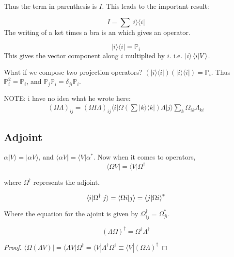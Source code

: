 \documentclass[11pt]{scrartcl}
\begin{document}
Thus the term in parenthesis is $ I $. This leads to the important result:

\begin{equation}
	I = \sum |i \rangle \langle i | 
\end{equation}
The writing of a ket times a bra is an  which gives an operator. 
\begin{definition}
\begin{equation}
	|i \rangle \langle i | = \mathds{P}_i
\end{equation}
This gives the vector component along $ i $ multiplied by $ i $. i.e. $ |i \rangle \braket{i|V}  $. 
\end{definition}

What if we compose two projection operators? $ (|i \rangle \langle i | ) ( |i \rangle \langle i | ) = \mathds{P}_i$. Thus $ \mathds{P}_i^2 = \mathds{P}_i $, and $ \mathds{P}_j \mathds{P}_i = \delta _{ji} \mathds{P}_i $.


NOTE: i have no idea what he wrote here:
\begin{align}
	(\Omega \Lambda) _{ij} = (\Omega I \Lambda) _{ij} \langle i | \Omega ( \sum |k \rangle \langle k |  ) \Lambda |j \rangle \sum_k \Omega _{ik} \Lambda _{ki} 
\end{align}

\subsection{Adjoint}
$ \alpha |V \rangle  = |\alpha V \rangle  $, and  $ \langle \alpha V | = \langle V | \alpha^* $. Now when it comes to operators,
\begin{equation}
	\langle \Omega V | = \langle V | \Omega ^{\dag} 
\end{equation}

where $ \Omega ^{\dag}  $ represents the adjoint.

\begin{equation}
	\langle i | \Omega ^{\dag} |j \rangle = \braket{\Omega i|j} = \braket{j|\Omega i} ^*  
\end{equation}

Where the equation for the ajoint is given by $ \Omega ^{\dag}  _{ij} = \Omega _{ji} ^* $. 

\begin{lemma}
	\begin{equation}
		(\Lambda \Omega) ^{\dag} = \Omega ^{\dag} \Lambda ^{\dag} 
	\end{equation}
\end{lemma}
\begin{proof}
$ \langle \Omega (\Lambda V) | = \langle \Lambda V | \Omega ^{\dag}  = \langle V | \Lambda ^{\dag} \Omega ^{\dag} \equiv \langle V | (\Omega \Lambda) ^{\dag}   $
\end{proof}
\end{document}
